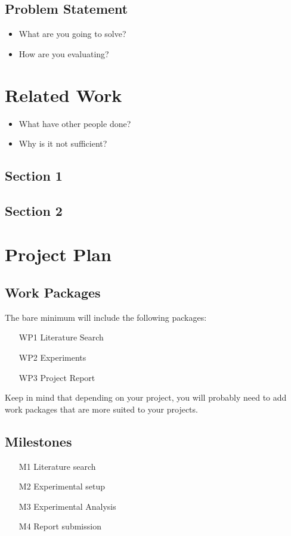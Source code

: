 \documentclass[thesis]{mas_proposal}
\begin{document}
\section{Problem Statement}
\begin{itemize}
    \item What are you going to solve?
    \item How are you evaluating?
\end{itemize}


\chapter{Related Work}
\begin{itemize}
    \item What have other people done?
    \item Why is it not sufficient?
\end{itemize}

\section{Section 1}
\section{Section 2}



\chapter{Project Plan}

\section{Work Packages}
The bare minimum will include the following packages:
\begin{enumerate}
    \item[WP1] Literature Search
    \item[WP2] Experiments
    \item[WP3] Project Report
\end{enumerate}
Keep in mind that depending on your project, you will probably need to add work packages that are more suited to your projects.

\section{Milestones}
\begin{enumerate}
    \item[M1] Literature search
    \item[M2] Experimental setup
    \item[M3] Experimental Analysis
    \item[M4] Report submission
\end{enumerate}
\end{document}
